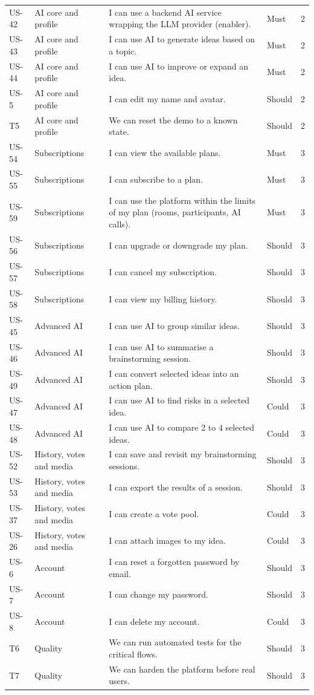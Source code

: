 \documentclass[12pt,a4paper]{report}
\begin{document}
\begin{longtable}{@{}p{}p{}p{}p{}p{}@{}}
US-42 & AI core and profile & I can use a backend AI service wrapping the LLM provider (enabler). & Must & 2 \\
US-43 & AI core and profile & I can use AI to generate ideas based on a topic. & Must & 2 \\
US-44 & AI core and profile & I can use AI to improve or expand an idea. & Must & 2 \\
US-5 & AI core and profile & I can edit my name and avatar. & Should & 2 \\
T5 & AI core and profile & We can reset the demo to a known state. & Should & 2 \\
US-54 & Subscriptions & I can view the available plans. & Must & 3 \\
US-55 & Subscriptions & I can subscribe to a plan. & Must & 3 \\
US-59 & Subscriptions & I can use the platform within the limits of my plan (rooms, participants, AI calls). & Must & 3 \\
US-56 & Subscriptions & I can upgrade or downgrade my plan. & Should & 3 \\
US-57 & Subscriptions & I can cancel my subscription. & Should & 3 \\
US-58 & Subscriptions & I can view my billing history. & Should & 3 \\
US-45 & Advanced AI & I can use AI to group similar ideas. & Should & 3 \\
US-46 & Advanced AI & I can use AI to summarise a brainstorming session. & Should & 3 \\
US-49 & Advanced AI & I can convert selected ideas into an action plan. & Should & 3 \\
US-47 & Advanced AI & I can use AI to find risks in a selected idea. & Could & 3 \\
US-48 & Advanced AI & I can use AI to compare 2 to 4 selected ideas. & Could & 3 \\
US-52 & History, votes and media & I can save and revisit my brainstorming sessions. & Should & 3 \\
US-53 & History, votes and media & I can export the results of a session. & Should & 3 \\
US-37 & History, votes and media & I can create a vote pool. & Could & 3 \\
US-26 & History, votes and media & I can attach images to my idea. & Could & 3 \\
US-6 & Account & I can reset a forgotten password by email. & Should & 3 \\
US-7 & Account & I can change my password. & Should & 3 \\
US-8 & Account & I can delete my account. & Could & 3 \\
T6 & Quality & We can run automated tests for the critical flows. & Should & 3 \\
T7 & Quality & We can harden the platform before real users. & Should & 3 \\
\end{longtable}
\end{document}
